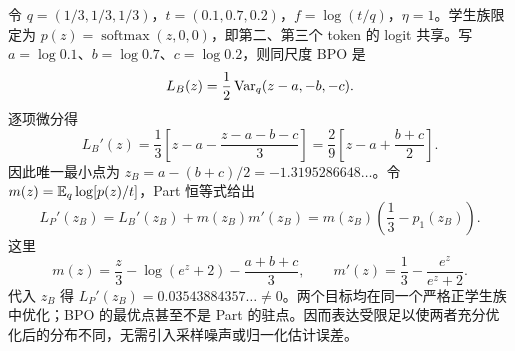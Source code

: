 \begin{example}
令 $q=(1/3,1/3,1/3)$，$t=(0.1,0.7,0.2)$，$f=\log(t/q)$，$\eta=1$。学生族限定为 $p(z)=\operatorname{softmax}(z,0,0)$，即第二、第三个 token 的 logit 共享。写 $a=\log0.1$、$b=\log0.7$、$c=\log0.2$，则同尺度 BPO 是
\begin{equation}
L_B(z)=\frac12\operatorname{Var}_q(z-a,-b,-c).
\end{equation}
逐项微分得
\begin{equation}
L_B'(z)=\frac13\left[z-a-\frac{z-a-b-c}{3}\right]
=\frac29\left[z-a+\frac{b+c}{2}\right].
\end{equation}
因此唯一最小点为 $z_B=a-(b+c)/2=-1.3195286648\ldots$。令 $m(z)=\mathbb E_q\log[p(z)/t]$，Part 恒等式给出
\begin{equation}
L_P'(z_B)=L_B'(z_B)+m(z_B)m'(z_B)
=m(z_B)\left(\frac13-p_1(z_B)\right).
\end{equation}
这里
\begin{equation}
m(z)=\frac z3-\log(e^z+2)-\frac{a+b+c}{3},\qquad
m'(z)=\frac13-\frac{e^z}{e^z+2}.
\end{equation}
代入 $z_B$ 得 $L_P'(z_B)=0.03543884357\ldots\ne0$。两个目标均在同一个严格正学生族中优化；BPO 的最优点甚至不是 Part 的驻点。因而表达受限足以使两者充分优化后的分布不同，无需引入采样噪声或归一化估计误差。
\end{example}
